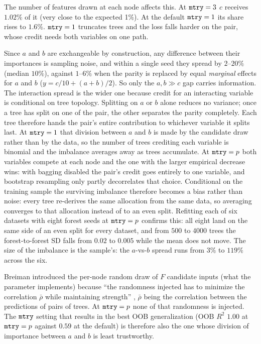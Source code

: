 The number of features drawn at each node affects this.
At $\texttt{mtry} = 3$
$c$ receives $1.02\%$
of it (very close to the expected 1\%).  
At the default $\texttt{mtry} = 1$ its share rises to $1.6\%$.
$\texttt{mtry} = 1$ truncates trees and the loss falls harder on the pair, whose
credit needs both variables on one path. 

Since $a$ and $b$ are exchangeable by construction, any difference between their
importances is sampling noise, and within a single seed they spread by
$2$--$20\%$ (median $10\%$), against $1$--$6\%$ when the parity is replaced by
equal \emph{marginal} effects for $a$ and $b$ ($y = c/10 + (a + b)/2$).
So only the $a,b \gg c$ gap carries information.
The interaction spread is the wider one because credit for an interacting
variable is
conditional on tree topology. Splitting on $a$ or $b$ alone reduces no variance;
once a tree has split on one of the pair, the
other separates the parity completely. Each tree therefore hands the pair's
entire contribution to whichever variable it splits last.
At $\texttt{mtry} = 1$ that division between $a$ and $b$ is made by the
candidate draw rather than by the data,
so the number of trees crediting each variable is binomial and the imbalance
averages
away as trees accumulate.
At
$\texttt{mtry} = p$ both variables compete at each node and the one with the
larger
empirical decrease wins:
with bagging disabled the pair's credit goes entirely to one variable, and
bootstrap resampling only partly decorrelates that choice.
Conditional on the
training sample the surviving imbalance therefore becomes a bias rather than
noise:
every tree re-derives the same allocation from the same data, so averaging
converges to that allocation instead of to an even split. Refitting each of six
datasets with
eight forest seeds at $\texttt{mtry} = p$ confirms this: all eight land on the
same side of an even split for every dataset, and from $500$ to $4000$ trees the
forest-to-forest SD falls from $0.02$ to $0.005$ while the mean does not move.
The size of the imbalance is the sample's: the $a$-vs-$b$ spread runs from
$3\%$ to $119\%$ across the six.

Breiman introduced the per-node
random draw of $F$ candidate inputs (what the parameter  implements)
because
``the randomness injected has to minimize the correlation $\bar\rho$ while
maintaining strength'' \citep[\S3; Thm.~11.2 for regression]{breiman2001},
$\bar\rho$ being the correlation between the predictions of pairs of trees.
At $\texttt{mtry} = p$ none of that randomness is injected. The $\texttt{mtry}$
setting that results in the best OOB generalization (OOB $R^2$ $1.00$ at
$\texttt{mtry} = p$ against $0.59$ at the default) is therefore also the one whose
division of
importance between $a$ and $b$ is least trustworthy.

